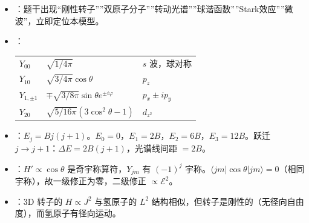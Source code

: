 \begin{tipbox}[快速识别与解题技巧]
\begin{itemize}
    \item {}：题干出现``刚性转子''''双原子分子''''转动光谱''''球谐函数''''Stark效应''''微波''，立即定位本模型。
    \item {}：
    \begin{center}
    \begin{tabular}{lll}
    \toprule
    $Y_{00}$ & $\sqrt{1/4\pi}$ & $s$ 波，球对称 \\
    $Y_{10}$ & $\sqrt{3/4\pi}\cos\theta$ & $p_z$ \\
    $Y_{1,\pm1}$ & $\mp\sqrt{3/8\pi}\sin\theta e^{\pm i\varphi}$ & $p_x\pm ip_y$ \\
    $Y_{20}$ & $\sqrt{5/16\pi}(3\cos^2\theta-1)$ & $d_{z^2}$ \\
    \bottomrule
    \end{tabular}
    \end{center}
    \item {}：$E_j=Bj(j+1)$。$E_0=0$，$E_1=2B$，$E_2=6B$，$E_3=12B$。跃迁 $j\to j+1$：$\Delta E=2B(j+1)$，光谱线间距 $=2B$。
    \item {}：$H'\propto\cos\theta$ 是奇宇称算符，$Y_{jm}$ 有 $(-1)^j$ 宇称。$\langle jm|\cos\theta|jm\rangle=0$（相同宇称），故一级修正为零，二级修正 $\propto\mathcal{E}^2$。
    \item {}：3D 转子的 $H\propto J^2$ 与氢原子的 $L^2$ 结构相似，但转子是刚性的（无径向自由度），而氢原子有径向运动。
\end{itemize}
\end{tipbox}

